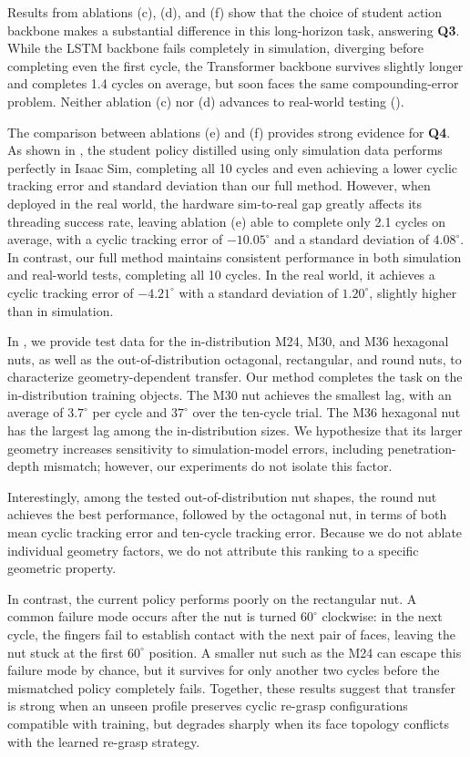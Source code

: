 Results from ablations (c), (d), and (f) show that the choice of student action
backbone makes a substantial difference in this long-horizon task, answering
\textbf{Q3}. While the LSTM backbone fails completely in simulation, diverging
before completing even the first cycle, the Transformer backbone survives
slightly longer and completes 1.4 cycles on average, but soon faces the same
compounding-error problem. Neither ablation (c) nor (d) advances to real-world
testing ().

The comparison between ablations (e) and (f) provides strong evidence for
\textbf{Q4}. As shown in , the student policy distilled
using only simulation data performs perfectly in Isaac Sim, completing all 10
cycles and even achieving a lower cyclic tracking error and standard deviation
than our full method. However, when deployed in the real world, the hardware
sim-to-real gap greatly affects its threading success rate, leaving ablation
(e) able to complete only 2.1 cycles on average, with a cyclic tracking error of
$-10.05^\circ$ and a standard deviation of $4.08^\circ$. In contrast, our full
method maintains consistent performance in both simulation and real-world
tests, completing all 10 cycles. In the real world, it achieves a cyclic
tracking error of $-4.21^\circ$ with a standard deviation of $1.20^\circ$,
slightly higher than in simulation.



In , we provide test data for the in-distribution
M24, M30, and M36 hexagonal nuts, as well as the out-of-distribution octagonal,
rectangular, and round nuts, to characterize geometry-dependent transfer. Our
method completes the task on the in-distribution training objects.
The M30 nut achieves the smallest lag, with an average of $3.7^\circ$ per cycle
and $37^\circ$ over the ten-cycle trial. The M36 hexagonal nut has the largest
lag among the in-distribution sizes. We hypothesize that its larger geometry
increases sensitivity to simulation-model errors, including penetration-depth
mismatch; however, our experiments do not isolate this factor.

Interestingly, among the tested out-of-distribution nut shapes, the round nut
achieves the best performance, followed by the octagonal nut, in terms of both
mean cyclic tracking error and ten-cycle tracking error. Because we do not
ablate individual geometry factors, we do not attribute this ranking to a
specific geometric property.

In contrast, the current policy performs poorly on the rectangular nut. A
common failure mode occurs after the nut is turned $60^\circ$
clockwise: in the next cycle, the fingers fail to establish contact with the
next pair of faces, leaving the nut stuck at the first $60^\circ$ position. A
smaller nut such as the M24 can escape
this failure mode by chance, but it survives for only another two cycles before
the mismatched policy completely fails. Together, these results suggest that
transfer is strong when an unseen profile preserves cyclic re-grasp
configurations compatible with training, but degrades sharply when its face
topology conflicts with the learned re-grasp strategy.
